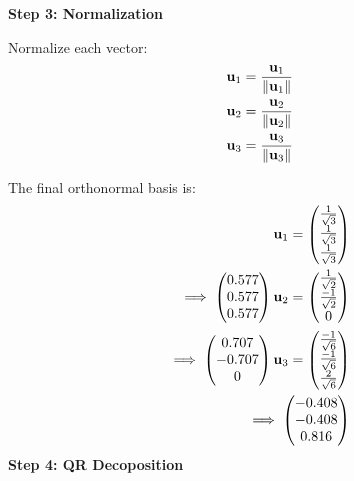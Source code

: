 \documentclass[11pt]{book}
\begin{document}
\begin{enumerate}
\textbf{Step 3: Normalization}

Normalize each vector:
\begin{align}
\mathbf{u}_1 = \frac{\mathbf{u}_1}{\left\lVert\mathbf{u}_1\right\rVert} \\
\mathbf{u}_2 = \frac{\mathbf{u}_2}{\left\lVert\mathbf{u}_2\right\rVert} \\
\mathbf{u}_3 = \frac{\mathbf{u}_3}{\left\lVert\mathbf{u}_3\right\rVert} 
\end{align}

The final orthonormal basis is:
\begin{align*}
\mathbf{u}_1 = \begin{pmatrix}\frac{1}{\sqrt{3}}\\ \frac{1}{\sqrt{3}}\\ \frac{1}{\sqrt{3}}\end{pmatrix} \\
\implies\begin{pmatrix}0.577\\0.577\\0.577\end{pmatrix}
\mathbf{u}_2 = \begin{pmatrix}\frac{1}{\sqrt{2}}\\\frac{-1}{\sqrt{2}}\\0 \end{pmatrix}\\
\implies \begin{pmatrix}0.707 \\ -0.707 \\ 0\end{pmatrix}
\mathbf{u}_3 = \begin{pmatrix}\frac{-1}{\sqrt{6}}\\ \frac{-1}{\sqrt{6}}\\ \frac{2}{\sqrt{6}}\end{pmatrix} \\
\implies \begin{pmatrix}-0.408\\-0.408\\0.816\end{pmatrix}
\end{align*}
\textbf{Step 4: QR Decoposition}


\end{enumerate}
\end{document}
